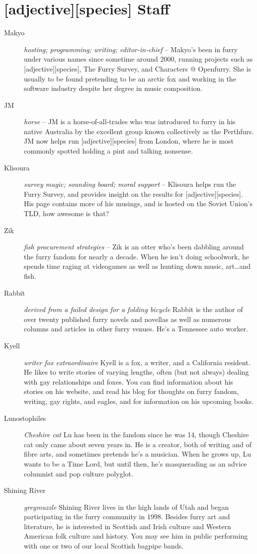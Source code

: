 \section*{[adjective][species] Staff}

\begin{description}
  \item[Makyo] \textit{hosting; programming; writing; editor-in-chief} -- Makyo's been in furry under various names since sometime around 2000, running projects such as [adjective][species], The Furry Survey, and Characters @ Openfurry.  She is usually to be found pretending to be an arctic fox and working in the software industry despite her degree in music composition.
  \item[JM] \textit{horse} -- JM is a horse-of-all-trades who was introduced to furry in his native Australia by the excellent group known collectively as the Perthfurs. JM now helps run [adjective][species] from London, where he is most commonly spotted holding a pint and talking nonsense.
  \item[Klisoura] \textit{survey magic; sounding board; moral support} -- Klisoura helps run the Furry Survey, and provides insight on the results for [adjective][species]. His page contains more of his musings, and is hosted on the Soviet Union's TLD, how awesome is that?
  \item[Zik] \textit{fish procurement strategies} -- Zik is an otter who's been dabbling around the furry fandom for nearly a decade. When he isn't doing schoolwork, he spends time raging at videogames as well as hunting down music, art\ldots and fish.
  \item[Rabbit] \textit{derived from a failed design for a folding bicycle} Rabbit is the author of over twenty published furry novels and novellas as well as numerous columns and articles in other furry venues. He’s a Tennessee auto worker.
  \item[Kyell] \textit{writer fox extraordinaire} Kyell is a fox, a writer, and a California resident. He likes to write stories of varying lengths, often (but not always) dealing with gay relationships and foxes. You can find information about his stories on his website, and read his blog for thoughts on furry fandom, writing, gay rights, and eagles, and for information on his upcoming books.
  \item[Lunostophiles] \textit{Cheshire cat} Lu has been in the fandom since he was 14, though Cheshire cat only came about seven years in. He is a creator, both of writing and of fibre arts, and sometimes pretends he’s a musician. When he grows up, Lu wants to be a Time Lord, but until then, he’s masquerading as an advice columnist and pop culture polyglot.
  \item[Shining River] \textit{greymuzzle} Shining River lives in the high lands of Utah and began participating in the furry community in 1998. Besides furry art and literature, he is interested in Scottish and Irish culture and Western American folk culture and history. You may see him in public performing with one or two of our local Scottish bagpipe bands.
\end{description}

